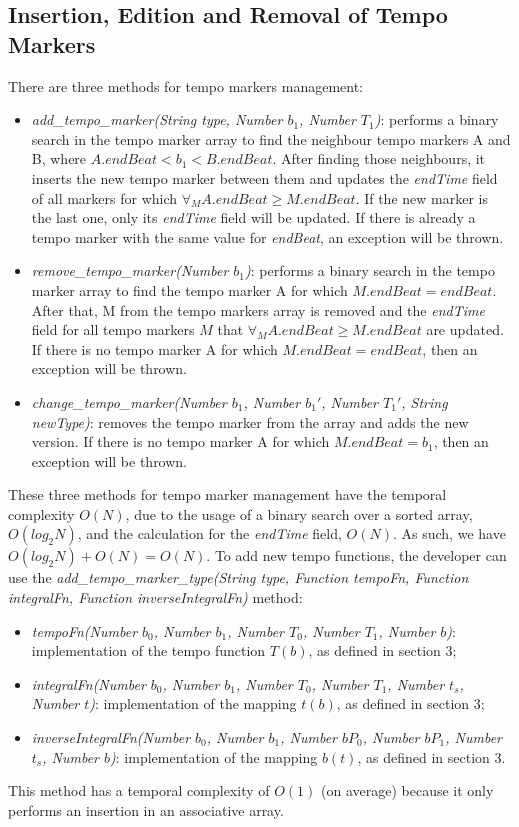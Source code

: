 \documentclass{sig-alternate}
\begin{document}
\subsection{Insertion, Edition and Removal of Tempo Markers}
\begin{sloppypar}
There are three methods for tempo markers management: 
\begin{itemize}
	\item \textit{add\_tempo\_marker(String type, Number $b_1$, Number $T_1$)}: performs a binary search in the tempo marker array to find the neighbour tempo markers A and B, where $A.endBeat < b_1 < B.endBeat$. After finding those neighbours, it inserts the new tempo marker between them and updates the \textit{endTime} field of all markers for which $\forall_{M} A.endBeat \geq M.endBeat$. If the new marker is the last one, only its \textit{endTime} field will be updated. If there is already a tempo marker with the same value for \textit{endBeat}, an exception will be thrown.
	\item \textit{remove\_tempo\_marker(Number $b_1$)}: performs a binary search in the tempo marker array to find the tempo marker A for which $M.endBeat=endBeat$. After that, M from the tempo markers array is removed and the \textit{endTime} field for all tempo markers $M$ that $\forall_{M} A.endBeat \geq M.endBeat$ are updated. If there is no tempo marker A for which $M.endBeat=endBeat$, then an exception will be thrown.
	\item \textit{change\_tempo\_marker(Number $b_1$, Number $b_{1}'$, Number $T_{1}'$, String newType)}: removes the tempo marker from the array and adds the new version. If there is no tempo marker A for which $M.endBeat=b_1$, then an exception will be thrown.
\end{itemize}
These three methods for tempo marker management have the temporal complexity $O(N)$, due to the usage of a binary search over a sorted array, $O(log_2 N)$, and the calculation for the \textit{endTime} field, $O(N)$. As such, we have $O(log_2 N) + O(N) = O(N)$. To add new tempo functions, the developer can use the \textit{add\_tempo\_marker\_type(String type, Function tempoFn, Function integralFn, Function inverseIntegralFn)} method: 
\begin{itemize}
	\item \textit{tempoFn(Number $b_0$, Number $b_1$, Number $T_0$, Number $T_1$, Number $b$)}: implementation of the tempo function $T(b)$, as defined in section 3;
	\item \textit{integralFn(Number $b_0$, Number $b_1$, Number $T_0$, Number $T_1$, Number $t_s$, Number $t$)}: implementation of the mapping $t(b)$, as defined in section 3;
	\item \textit{inverseIntegralFn(Number $b_0$, Number $b_1$, Number $bP_0$, Number $bP_1$, Number $t_s$, Number $b$)}: implementation of the mapping $b(t)$, as defined in section 3.
\end{itemize}
This method has a temporal complexity of $O(1)$ (on average) because it only performs an insertion in an associative array.
\end{sloppypar}
\end{document}
